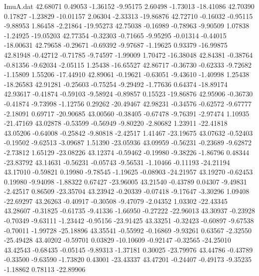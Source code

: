 \begin{filecontents}{ImuA.dat}
  42.68071    0.49053   -1.36152   -9.95175    2.60498   -1.73013  -18.41086
  42.70390    0.17827   -1.23829  -10.01157    2.06304   -2.33313  -19.86876
  42.72710   -0.16032   -0.95115   -9.88953    1.86458   -2.21864  -19.95273
  42.75038   -0.16989   -0.78963   -9.90509    1.07838   -1.24925  -19.05203
  42.77354   -0.32303   -0.71665   -9.95295   -0.01314   -0.44015  -18.00631
  42.79658   -0.29671   -0.69392   -9.97687   -1.19625    0.93379  -16.99875
  42.81948   -0.42712   -0.71785   -9.74597   -1.99009    1.70472  -16.38048
  42.84381   -0.38764   -0.81356   -9.62034   -2.05115    1.25438  -16.65527
  42.86717   -0.36730   -0.62333   -9.72682   -1.15809    1.55206  -17.44910
  42.89061   -0.19621   -0.63051   -9.43610   -1.40998    1.25438  -18.26583
  42.91281   -0.25603   -0.75254   -9.29492   -1.77636    0.64374  -18.89174
  42.93617   -0.41874   -0.59103   -9.58924   -0.89857    0.15523  -19.86876
  42.95906   -0.36730   -0.41874   -9.73998   -1.12756    0.29262  -20.49467
  42.98231   -0.34576   -0.62572   -9.67777   -2.18091    0.69717  -20.90685
  43.00560   -0.38405   -0.67478   -9.76391   -2.97474    1.10935  -21.47169
  43.02878   -0.53599   -0.56949   -9.80220   -2.80682    1.23911  -22.41818
  43.05206   -0.64008   -0.25842   -9.80818   -2.42517    1.41467  -23.19675
  43.07632   -0.52403   -0.19502   -9.62513   -3.09687    1.51390  -23.05936
  43.09959   -0.56231   -0.23689   -9.62872   -2.73812    1.65129  -23.08226
  43.12374   -0.59462   -0.19980   -9.38226   -1.86796    0.48344  -23.83792
  43.14631   -0.56231   -0.05743   -9.56531   -1.10466   -0.11193  -24.21194
  43.17010   -0.59821    0.19980   -9.78545   -1.19625   -0.08903  -24.21957
  43.19270   -0.62453    0.19980   -9.94098   -1.88322    0.67427  -23.96005
  43.21540   -0.43789    0.04307   -9.49831   -2.42517    0.86509  -23.35704
  43.23942   -0.20339   -0.07418   -9.17647   -3.30296    1.09408  -22.69297
  43.26263   -0.40917   -0.30508   -9.47079   -2.04352    1.03302  -22.43345
  43.28607   -0.31825   -0.61735   -9.41336   -1.66950   -0.27222  -22.96013
  43.30937   -0.23928   -0.70349   -9.63111   -1.23442   -0.95156  -23.91425
  43.33251   -0.32423   -0.60897   -9.67538   -0.70011   -1.99728  -25.18896
  43.35541   -0.55992   -0.16869   -9.93261    0.63567   -2.32550  -25.49428
  43.40202   -0.59701    0.03829  -10.10609   -0.92147   -0.32565  -24.25010
  43.42543   -0.68435   -0.05145   -9.89313   -1.37181    0.30025  -23.79976
  43.44786   -0.43789   -0.33500   -9.63590   -1.73820    0.43001  -23.43337
  43.47201   -0.24407   -0.49173   -9.35235   -1.18862    0.78113  -22.89906

\end{filecontents}
